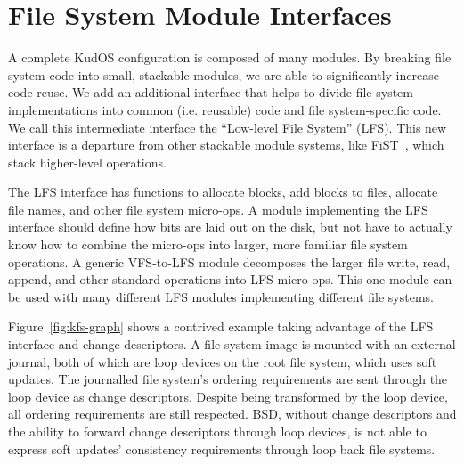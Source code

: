 \preparagraphspacing{}
\section*{File System Module Interfaces}
\label{sec:interfaces}

A complete KudOS configuration is composed of many modules.
By breaking file system code into
small, stackable modules, we are able to significantly increase code reuse.
We add an additional interface that helps to divide file system
implementations into common (i.e. reusable) code and file system-specific code.
We call this intermediate interface the ``Low-level File System'' (LFS). This
new interface is a departure from other stackable module systems,
like FiST~\cite{zadok00fist}, which stack higher-level operations.

The LFS interface has functions to allocate blocks, add blocks to
files, allocate file names, and other file system micro-ops. A module
implementing the LFS interface should define how bits are laid out on
the disk, but not have to actually know how to combine the micro-ops
into larger, more familiar file system operations. 
A generic VFS-to-LFS module decomposes the larger file write,
read, append, and other standard operations into LFS micro-ops. This
one module can be used with many different LFS modules implementing
different file systems.

Figure~\ref{fig:kfs-graph} shows a contrived example taking advantage of the LFS
interface and change descriptors.  A file system image is mounted
with an external journal, both of which are loop devices on the root file system,
which uses soft updates. The journalled file system's ordering requirements are
sent through the loop device as change descriptors. Despite being transformed
by the loop device, all ordering requirements are still respected.
%
BSD, without change descriptors and the ability to forward change
descriptors through loop devices, is not able to express soft updates'
consistency requirements through loop back file systems.
